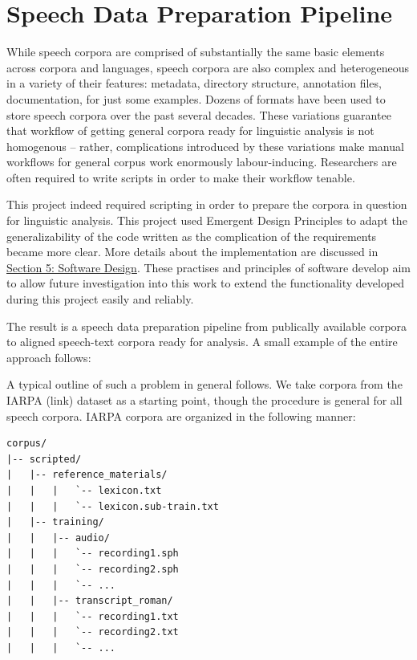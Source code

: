\documentclass[11pt]{article}
\begin{document}
\section{Speech Data Preparation Pipeline}

While speech corpora are comprised of substantially the same basic elements across corpora and languages, speech corpora are also complex and heterogeneous in a variety of their features: metadata, directory structure, annotation files, documentation, for just some examples. Dozens of formats have been used to store speech corpora over the past several decades. These variations guarantee that workflow of getting general corpora ready for linguistic analysis is not homogenous -- rather, complications introduced by these variations make manual workflows for general corpus work enormously labour-inducing. Researchers are often required to write scripts in order to make their workflow tenable.

This project indeed required scripting in order to prepare the corpora in question for linguistic analysis. This project used Emergent Design Principles\cite{bain_emergent_2008} to adapt the generalizability of the code written as the complication of the requirements became more clear. More details about the implementation are discussed in \hyperlink{section.4}{Section 5: Software Design}. These practises and principles of software develop aim to allow future investigation into this work to extend the functionality developed during this project easily and reliably.

The result is a speech data preparation pipeline from publically available corpora to aligned speech-text corpora ready for analysis. A small example of the entire approach follows:


A typical outline of such a problem in general follows. We take corpora from the IARPA (link) dataset as a starting point, though the procedure is general for all speech corpora. IARPA corpora are organized in the following manner:

\begin{singlespace}
\begin{verbatim}
corpus/
|-- scripted/
|   |-- reference_materials/
|   |   |   `-- lexicon.txt
|   |   |   `-- lexicon.sub-train.txt
|   |-- training/
|   |   |-- audio/
|   |   |   `-- recording1.sph
|   |   |   `-- recording2.sph
|   |   |   `-- ...
|   |   |-- transcript_roman/
|   |   |   `-- recording1.txt
|   |   |   `-- recording2.txt
|   |   |   `-- ...
\end{verbatim}
\end{singlespace}
\end{document}
